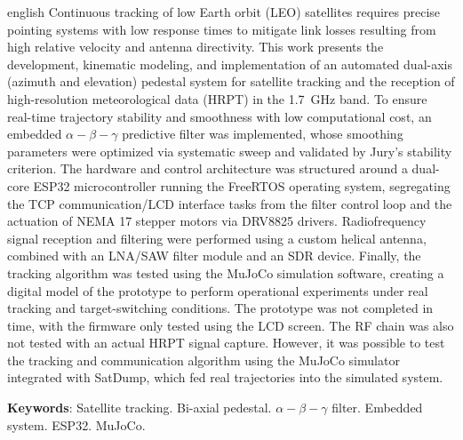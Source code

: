 \begin{resumo}[Abstract]
 \begin{otherlanguage*}{english}
  Continuous tracking of low Earth orbit (LEO) satellites requires precise pointing systems with low response times to mitigate link losses resulting from high relative velocity and antenna directivity.
  This work presents the development, kinematic modeling, and implementation of an automated dual-axis (azimuth and elevation) pedestal system for satellite tracking and the reception of high-resolution meteorological data (HRPT) in the 1.7~GHz band.
  To ensure real-time trajectory stability and smoothness with low computational cost, an embedded $\alpha-\beta-\gamma$ predictive filter was implemented, whose smoothing parameters were optimized via systematic sweep and validated by Jury's stability criterion.
  The hardware and control architecture was structured around a dual-core ESP32 microcontroller running the FreeRTOS operating system, segregating the TCP communication/LCD interface tasks from the filter control loop and the actuation of NEMA 17 stepper motors via DRV8825 drivers.
  Radiofrequency signal reception and filtering were performed using a custom helical antenna, combined with an LNA/SAW filter module and an SDR device.
  Finally, the tracking algorithm was tested using the MuJoCo simulation software, creating a digital model of the prototype to perform operational experiments under real tracking and target-switching conditions.
  The prototype was not completed in time, with the firmware only tested using the LCD screen. The RF chain was also not tested with an actual HRPT signal capture.
  However, it was possible to test the tracking and communication algorithm using the MuJoCo simulator integrated with SatDump, which fed real trajectories into the simulated system.

  \vspace{\onelineskip}
  \textbf{Keywords}: Satellite tracking. Bi-axial pedestal. $\alpha-\beta-\gamma$ filter. Embedded system. ESP32.  MuJoCo.
 \end{otherlanguage*}
\end{resumo}